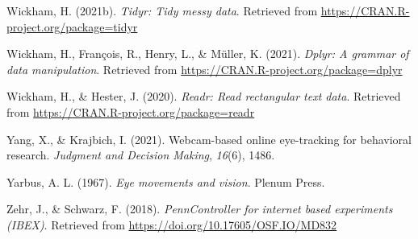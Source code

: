 \documentclass[
  man,floatsintext]{apa6}
\newlength{\cslhangindent}
\newenvironment{CSLReferences}[2] %
 {\begin{list}{}{%
  \setlength{\itemindent}{0pt}
  \setlength{\leftmargin}{0pt}
  \setlength{\parsep}{0pt}
  \ifodd #1
   \setlength{\leftmargin}{\cslhangindent}
   \setlength{\itemindent}{-1\cslhangindent}
  \fi
  \setlength{\itemsep}{#2\baselineskip}}}
 {\end{list}}
\begin{document}
\begin{CSLReferences}{1}{0}
Wickham, H. (2021b). \emph{Tidyr: Tidy messy data}. Retrieved from \url{https://CRAN.R-project.org/package=tidyr}

Wickham, H., François, R., Henry, L., \& Müller, K. (2021). \emph{Dplyr: A grammar of data manipulation}. Retrieved from \url{https://CRAN.R-project.org/package=dplyr}

Wickham, H., \& Hester, J. (2020). \emph{Readr: Read rectangular text data}. Retrieved from \url{https://CRAN.R-project.org/package=readr}

Yang, X., \& Krajbich, I. (2021). Webcam-based online eye-tracking for behavioral research. \emph{Judgment and Decision Making}, \emph{16}(6), 1486.

Yarbus, A. L. (1967). \emph{Eye movements and vision}. Plenum Press.

Zehr, J., \& Schwarz, F. (2018). \emph{PennController for internet based experiments (IBEX)}. Retrieved from \url{https://doi.org/10.17605/OSF.IO/MD832}

\end{CSLReferences}

\endgroup
\end{document}

